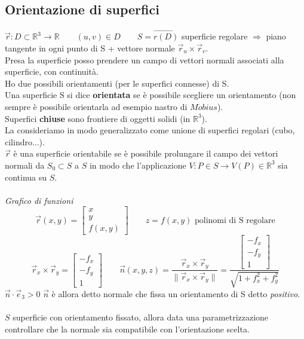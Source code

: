\documentclass[10pt]{article}
\theoremstyle{plain}
\theoremstyle{definition}
\begin{document}
\subsection{Orientazione di superfici}
$\vec{r}:D\subset \mathbb{R}^3 \rightarrow \mathbb{R} \qquad (u,v)\in D \qquad S=\vec{r(D)} $ superficie regolare $\Rightarrow$ piano tangente in ogni punto di S + vettore normale $\vec{r}_u \times \vec{r}_v$.\\
Presa la superficie posso prendere un campo di vettori normali associati alla superficie, con continuità.\\
Ho due possibili orientamenti (per le superfici connesse) di S.\\
Una superficie S si dice \textbf{orientata} se è possibile scegliere un orientamento (non sempre è possibile orientarla ad esempio nastro di $M \ddot o bius$).\\
Superfici \textbf{chiuse} sono frontiere di oggetti solidi (in $\mathbb{R}^3$).\\
La consideriamo in modo generalizzato come unione di superfici regolari (cubo, cilindro...).\\
$\vec{r}$ è una superficie orientabile se è possibile prolungare il campo dei vettori normali da $S_0 \subset S$ a $S$ in modo che l'applicazione $V:P\in S \rightarrow V(P) \in \mathbb{R}^3$ sia continua su $S$.\\
\\
\textit{Grafico di funzioni}
$$\vec{r}(x,y)=\begin{bmatrix} x \\ y \\ f(x,y) \end{bmatrix} \qquad z=f(x,y) \text{ polinomi di S regolare}$$
$$\vec{r}_x \times \vec{r}_y = \begin{bmatrix} -f_x \\ -f_y \\ 1 \end{bmatrix} \qquad \vec{n}(x,y,z) = \frac{\vec{r}_x \times \vec{r}_y}{\| \vec{r}_x \times \vec{r}_y \|} = \frac{\begin{bmatrix} -f_x \\ -f_y \\ 1 \end{bmatrix}}{\sqrt{1+f_x^2 +f_y^2}}$$
$\vec{n} \cdot \vec{e}_3 >0$ $\vec{n}$ è allora detto normale che fissa un orientamento di S detto \textit{positivo}.\\
\\
$S$ superficie con orientamento fissato, allora data una parametrizzazione controllare che la normale sia compatibile con l'orientazione scelta.\\
\end{document}

